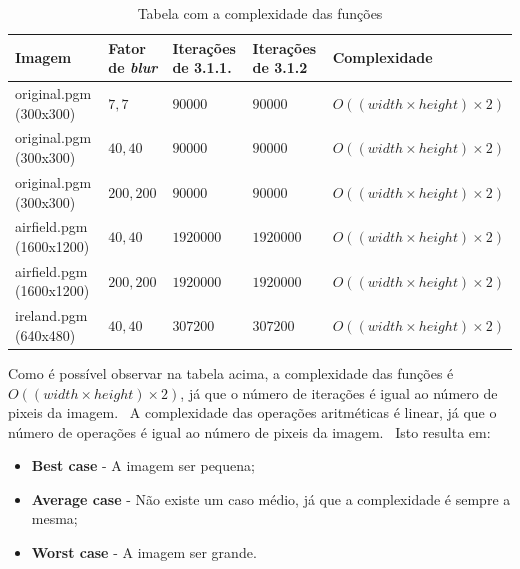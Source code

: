     \begin{table}[H]
        \centering
        \begin{tabular}{| p{23mm} | p{25mm} | p{30mm} | p{30mm} | p{38mm} |}
            \hline

            \textbf{Imagem} & \textbf{Fator de \textit{blur}} & \textbf{Iterações de 3.1.1.} & \textbf{Iterações de 3.1.2} & \textbf{Complexidade} \\ \hline

            original.pgm (300x300) & $7,7$ & $90000$ & $90000$ & $O((width \times height) \times 2)$ \\ \hline

            original.pgm (300x300) & $40,40$ & $90000$ & $90000$ & $O((width \times height) \times 2)$ \\ \hline

            original.pgm (300x300) & $200,200$ & $90000$ & $90000$ & $O((width \times height) \times 2)$ \\ \hline

            airfield.pgm (1600x1200) & $40,40$ & $1920000$ & $1920000$ & $O((width \times height) \times 2)$ \\ \hline

            airfield.pgm (1600x1200) & $200,200$ & $1920000$ & $1920000$ & $O((width \times height) \times 2)$ \\ \hline

            ireland.pgm (640x480) & $40,40$ & $307200$ & $307200$ & $O((width \times height) \times 2)$ \\ \hline
        \end{tabular}
        \caption{Tabela com a complexidade das funções}
        \label{tab:complexidade}
    \end{table}

    \newpage

    \par Como é possível observar na tabela acima, a complexidade das funções é $O((width \times height) \times 2)$, já que o número de iterações é igual ao número de pixeis da imagem. \ A complexidade das operações aritméticas é linear, já que o número de operações é igual ao número de pixeis da imagem. \ Isto resulta em:

    \begin{itemize}
        \item \textbf{Best case} - A imagem ser pequena;
        \item \textbf{Average case} - Não existe um caso médio, já que a complexidade é sempre a mesma;
        \item \textbf{Worst case} - A imagem ser grande.
    \end{itemize}


